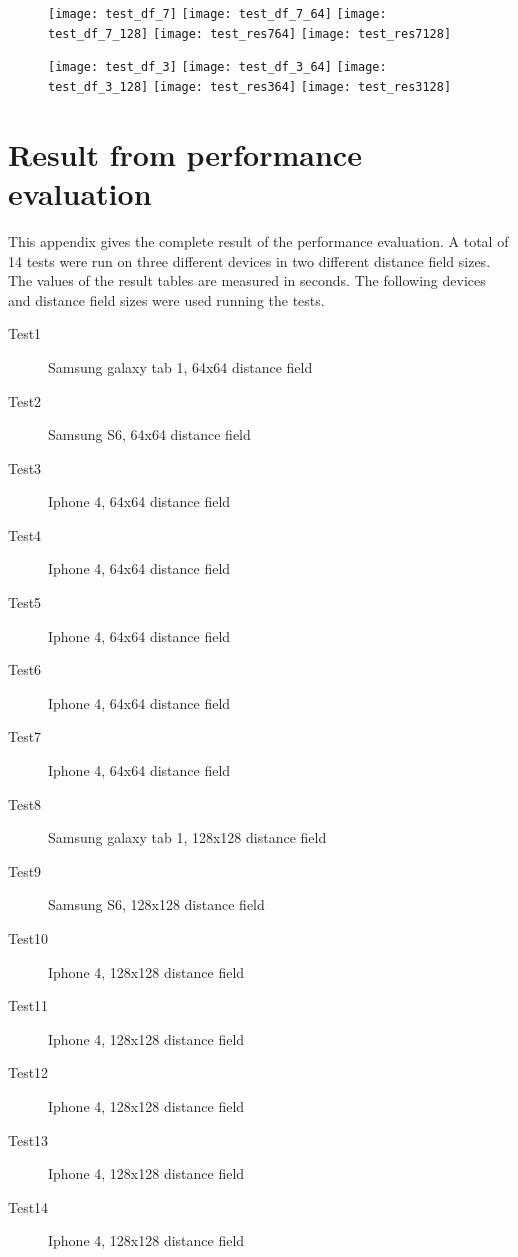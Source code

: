 \begin{figure}[H]
  \texttt{[image: test\_df\_7]}
\endminipage\hfill
{}
  \texttt{[image: test\_df\_7\_64]}
\endminipage\hfill
{}
  \texttt{[image: test\_df\_7\_128]}
\endminipage\hfill
{}
  \texttt{[image: test\_res764]}
\endminipage\hfill
{}
  \texttt{[image: test\_res7128]}
\endminipage\hfill
\end{figure}

\begin{figure}[H]
  \texttt{[image: test\_df\_3]}
\endminipage\hfill
{}
  \texttt{[image: test\_df\_3\_64]}
\endminipage\hfill
{}
  \texttt{[image: test\_df\_3\_128]}
\endminipage\hfill
{}
  \texttt{[image: test\_res364]}
\endminipage\hfill
{}
  \texttt{[image: test\_res3128]}
\endminipage\hfill
\end{figure}

\chapter{Result from performance evaluation}
This appendix gives the complete result of the performance evaluation. A total of 14 tests were run on three different devices in two different distance field sizes. The values of the result tables are measured in seconds. The following devices and distance field sizes were used running the tests.
\begin{description}
  \item[Test1] Samsung galaxy tab 1, 64x64 distance field
  \item[Test2] Samsung S6, 64x64 distance field
  \item[Test3] Iphone 4, 64x64 distance field
  \item[Test4] Iphone 4, 64x64 distance field
  \item[Test5] Iphone 4, 64x64 distance field
  \item[Test6] Iphone 4, 64x64 distance field
  \item[Test7] Iphone 4, 64x64 distance field
  \item[Test8] Samsung galaxy tab 1, 128x128 distance field
  \item[Test9] Samsung S6, 128x128 distance field
  \item[Test10] Iphone 4, 128x128 distance field
  \item[Test11] Iphone 4, 128x128 distance field
  \item[Test12] Iphone 4, 128x128 distance field
  \item[Test13] Iphone 4, 128x128 distance field
  \item[Test14] Iphone 4, 128x128 distance field
\end{description}

